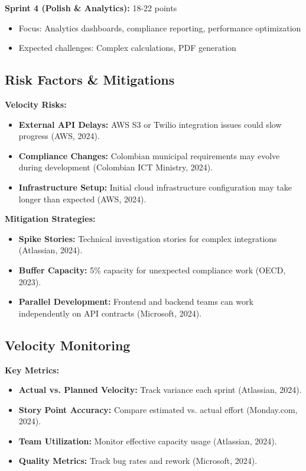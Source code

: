 \documentclass[12pt,a4paper]{article}
\begin{document}
\textbf{Sprint 4 (Polish \& Analytics):} 18-22 points
\begin{itemize}
    \item Focus: Analytics dashboards, compliance reporting, performance optimization
    \item Expected challenges: Complex calculations, PDF generation
\end{itemize}

\subsection{Risk Factors \& Mitigations}

\textbf{Velocity Risks:}
\begin{itemize}
    \item \textbf{External API Delays:} AWS S3 or Twilio integration issues could slow progress (AWS, 2024).
    \item \textbf{Compliance Changes:} Colombian municipal requirements may evolve during development (Colombian ICT Ministry, 2024).
    \item \textbf{Infrastructure Setup:} Initial cloud infrastructure configuration may take longer than expected (AWS, 2024).
\end{itemize}

\textbf{Mitigation Strategies:}
\begin{itemize}
    \item \textbf{Spike Stories:} Technical investigation stories for complex integrations (Atlassian, 2024).
    \item \textbf{Buffer Capacity:} 5\% capacity for unexpected compliance work (OECD, 2023).
    \item \textbf{Parallel Development:} Frontend and backend teams can work independently on API contracts (Microsoft, 2024).
\end{itemize}

\subsection{Velocity Monitoring}

\textbf{Key Metrics:}
\begin{itemize}
    \item \textbf{Actual vs. Planned Velocity:} Track variance each sprint (Atlassian, 2024).
    \item \textbf{Story Point Accuracy:} Compare estimated vs. actual effort (Monday.com, 2024).
    \item \textbf{Team Utilization:} Monitor effective capacity usage (Atlassian, 2024).
    \item \textbf{Quality Metrics:} Track bug rates and rework (Microsoft, 2024).
\end{itemize}
\end{document}
